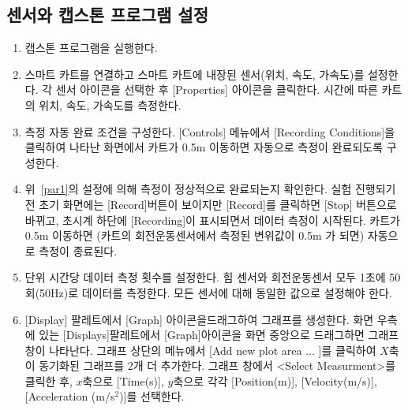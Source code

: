 \documentclass[12pt,a4paper]{article}
\begin{document}
\subsection{센서와 캡스톤 프로그램 설정}
\begin{enumerate}
    \item 캡스톤 프로그램을 실행한다.
    \item 스마트 카트를 연결하고 스마트 카트에 내장된 센서(위치, 속도, 가속도)를
        설정한다. 각 센서 아이콘을 선택한 후 [Properties] 아이콘을 클릭한다. 시간에
        따른 카트의 위치, 속도, 가속도를 측정한다.
    \item \label{par1} 측정 자동 완료 조건을 구성한다. [Controls] 메뉴에서
        [Recording Conditions]을 클릭하여 나타난 화면에서 카트가 0.5m 이동하면
        자동으로 측정이 완료되도록 구성한다.
    \item 위~\ref{par1}의 설정에 의해 측정이 정상적으로 완료되는지 확인한다. 실험
        진행되기 전 초기 화면에는 [Record]버튼이 보이지만 [Record]를 클릭하면 [Stop]
        버튼으로 바뀌고, 초시계 하단에 [Recording]이 표시되면서 데이터 측정이
        시작된다. 카트가 0.5m 이동하면 (카트의 회전운동센서에서 측정된 변위값이 0.5m
        가 되면) 자동으로 측정이 종료된다.
    \item 단위 시간당 데이터 측정 횟수를 설정한다. 힘 센서와 회전운동센서 모두 1초에
        50회(50Hz)로 데이터를 측정한다. 모든 센서에 대해 동일한 값으로 설정해야 한다.
    \item {[Display] 팔레트에서 [Graph] 아이콘을드래그하여 그래프를 생성한다.
        화면 우측에 있는 [Displays]팔레트에서 [Graph]아이콘을 화면 중앙으로
        드래그하면 그래프 창이 나타난다. 그래프 상단의 메뉴에서
        [Add new plot area ... ]를 클릭하여 $X$축이 동기화된 그래프를 2개 더
        추가한다. 그래프 창에서 <Select Measurment>를 클릭한 후, $x$축으로
        [Time(s)], $y$축으로 각각 [Position(m)], [Velocity(m/s)], 
        [Acceleration (m/s$^2$)]를 선택한다.}
\end{enumerate}
\end{document}
